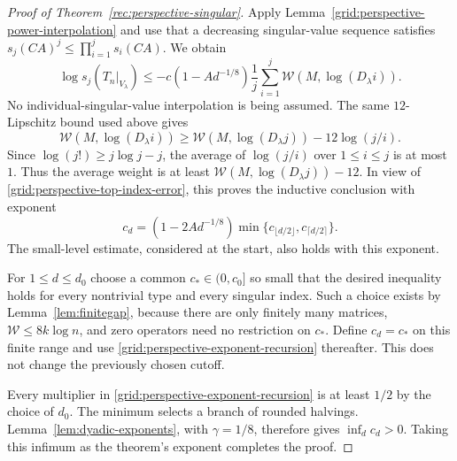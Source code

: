 \begin{proof}[Proof of Theorem~\ref{rec:perspective-singular}]
Apply Lemma~\ref{grid:perspective-power-interpolation} and use
that a decreasing singular-value sequence satisfies
$s_j(CA)^j\le\prod_{i=1}^j s_i(CA)$.  We obtain
\[
 \log s_j(T_n|_{V_\lambda})
 \le-c(1-Ad^{-1/8})\frac1j
          \sum_{i=1}^j\mathcal W(M,\log(D_\lambda i)).
\]
No individual-singular-value interpolation is being assumed.
The same $12$-Lipschitz bound used above gives
\[
 \mathcal W(M,\log(D_\lambda i))
 \ge\mathcal W(M,\log(D_\lambda j))-12\log(j/i).
\]
Since $\log(j!)\ge j\log j-j$, the average of
$\log(j/i)$ over $1\le i\le j$ is at most $1$.
Thus the average weight is at least
$\mathcal W(M,\log(D_\lambda j))-12$.  In view of
\eqref{grid:perspective-top-index-error}, this proves the
inductive conclusion with exponent
\begin{equation}\label{grid:perspective-exponent-recursion}
 c_d=(1-2Ad^{-1/8})
       \min\{c_{\lfloor d/2\rfloor},c_{\lceil d/2\rceil}\}.
\end{equation}
The small-level estimate, considered at the start, also holds
with this exponent.

For $1\le d\le d_0$ choose a common $c_*\in(0,c_0]$ so small
that the desired inequality holds for every nontrivial type and
every singular index.  Such a choice exists by
Lemma~\ref{lem:finitegap}, because there are only finitely many
matrices, $\mathcal W\le8k\log n$, and zero operators need no
restriction on $c_*$.  Define $c_d=c_*$ on this finite range and
use \eqref{grid:perspective-exponent-recursion} thereafter.
This does not change the previously chosen cutoff.

Every multiplier in \eqref{grid:perspective-exponent-recursion}
is at least $1/2$ by the choice of $d_0$. The minimum selects a
branch of rounded halvings. Lemma~\ref{lem:dyadic-exponents},
with $\gamma=1/8$, therefore gives $\inf_d c_d>0$.
Taking this infimum as the theorem's exponent completes the proof.
\end{proof}
